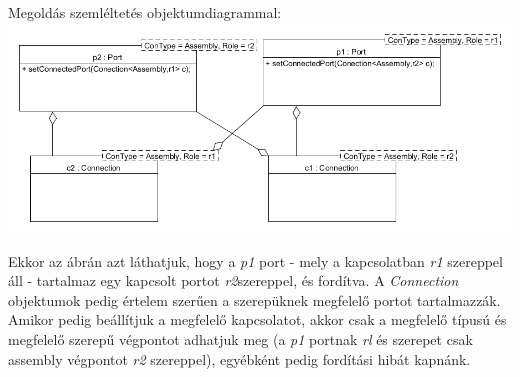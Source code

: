\documentclass[a4paper,12pt]{report}
\begin{document}
\begin{enumerate}
Megoldás szemléltetés objektumdiagrammal: \\
\includegraphics[scale=0.5]{conn_role.png}

Ekkor az ábrán azt láthatjuk, hogy a \textit{p1} port - mely a kapcsolatban \textit{r1} szereppel áll - tartalmaz egy kapcsolt portot \textit{r2}szereppel, és fordítva. A \textit{Connection} objektumok pedig értelem szerűen a szerepüknek megfelelő portot tartalmazzák. Amikor pedig beállítjuk a megfelelő kapcsolatot, akkor csak a megfelelő típusú és megfelelő szerepű végpontot adhatjuk meg (a \textit{p1} portnak \textit{rl} és szerepet csak assembly végpontot \textit{r2} szereppel), egyébként pedig fordítási hibát kapnánk. 
\end{enumerate}
\end{document}
